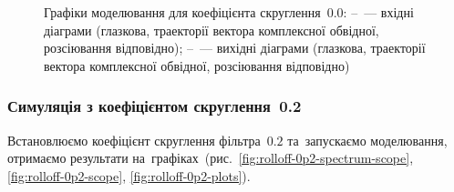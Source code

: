 \documentclass[
	a4paper,
	oneside,
	BCOR = 10mm,
	DIV = 12,
	12pt,
	headings = normal,
]{scrartcl}
\begin{document}
\begin{figure}[!htbp]
\begin{subfigure}{\textwidth / 3}
						\caption{}
						\label{subfig:rolloff-0p0-scatter-plot-out}
					\end{subfigure}%
					\caption{Графіки моделювання для коефіцієнта скруглення~$0.0$: –~— вхідні діаграми (глазкова, траекторії вектора комплексної обвідної, розсіювання відповідно); –~— вихідні діаграми (глазкова, траекторії вектора комплексної обвідної, розсіювання відповідно)}
					\label{fig:rolloff-0p0-plots}
				\end{figure}

			\clearpage
			\subsubsection{Симуляція з коефіцієнтом скруглення~0.2}
				Встановлюємо коефіцієнт скруглення фільтра~$0.2$ та~запускаємо моделювання, отримаємо результати на~графіках~(рис.~\ref{fig:rolloff-0p2-spectrum-scope}, \ref{fig:rolloff-0p2-scope}, \ref{fig:rolloff-0p2-plots}).
\end{document}
